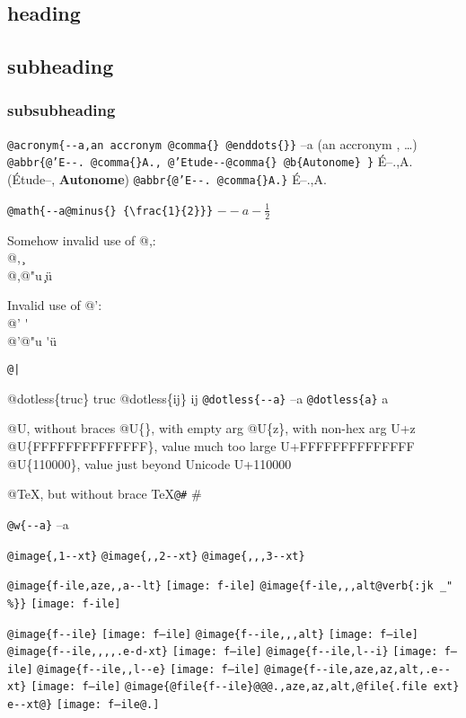 \documentclass{book}
\newcommand{\GNUTexinfoplaceholder}[1]{}
\newcommand{\GNUTexinfonopagebreakheading}[2]{\let\clearpage\relax \let\cleardoublepage\relax \let\thispagestyle\GNUTexinfoplaceholder #1{#2}}
\renewcommand{\includegraphics}[1]{\fbox{FIG \detokenize{#1}}}
\begin{document}
\begin{titlepage}
\GNUTexinfonopagebreakheading{\section*}{heading}

\GNUTexinfonopagebreakheading{\subsection*}{subheading}

\GNUTexinfonopagebreakheading{\subsubsection*}{subsubheading}


\texttt{@acronym\{{-}{-}a,an accronym @comma\{\} @enddots\{\}\}} --a (an accronym , \dots{})
\texttt{@abbr\{@'E{-}{-}. @comma\{\}A., @'Etude{-}{-}@comma\{\} @b\{Autonome\} \}} \'{E}--.\@ ,A.\@ (\'{E}tude--, \textbf{Autonome})
\texttt{@abbr\{@'E{-}{-}. @comma\{\}A.\}} \'{E}--.\@ ,A.\@

\texttt{@math\{{-}{-}a@minus\{\} \{\textbackslash{}frac\{1\}\{2\}\}\}} $--a- {\frac{1}{2}}$




Somehow invalid use of @,:\leavevmode{}\\
@, \c{}
\leavevmode{}\\
@,@"u \c{}\"{u}

Invalid use of @':\leavevmode{}\\
@' \'{}
\leavevmode{}\\
@'@"u \'{}\"{u}

\texttt{@|} 

@dotless\{truc\} truc
@dotless\{ij\} ij
\texttt{@dotless\{{-}{-}a\}} --a
\texttt{@dotless\{a\}} a

@U, without braces @U\{\}, with empty arg 
@U\{z\}, with non-hex arg U+z
@U\{FFFFFFFFFFFFFF\}, value much too large U+FFFFFFFFFFFFFF
@U\{110000\}, value just beyond Unicode U+110000

@TeX, but without brace \TeX{}\texttt{@\#} \#

\texttt{@w\{{-}{-}a\}} \hbox{--a}

\texttt{@image\{,1{-}{-}xt\}} 
\texttt{@image\{,,2{-}{-}xt\}} 
\texttt{@image\{,,,3{-}{-}xt\}} 

\texttt{@image\{f-ile,aze,,a{-}{-}lt\}} \texttt{[image: f-ile]}
\texttt{@image\{f-ile,,,alt@verb\{:jk \_" \%\@\}\}} \texttt{[image: f-ile]}

\texttt{@image\{f{-}{-}ile\}} \texttt{[image: f--ile]}
\texttt{@image\{f{-}{-}ile,,,alt\}} \texttt{[image: f--ile]}
\texttt{@image\{f{-}{-}ile,,,,.e-d-xt\}} \texttt{[image: f--ile]}
\texttt{@image\{f{-}{-}ile,l{-}{-}i\}} \texttt{[image: f--ile]}
\texttt{@image\{f{-}{-}ile,,l{-}{-}e\}} \texttt{[image: f--ile]}
\texttt{@image\{f{-}{-}ile,aze,az,alt,.e{-}{-}xt\}} \texttt{[image: f--ile]}
\texttt{@image\{@file\{f{-}{-}ile\}@@@.,aze,az,alt,@file\{.file ext\} e{-}{-}xt@\}} \texttt{[image: f--ile@.]}


\end{titlepage}
\end{document}
